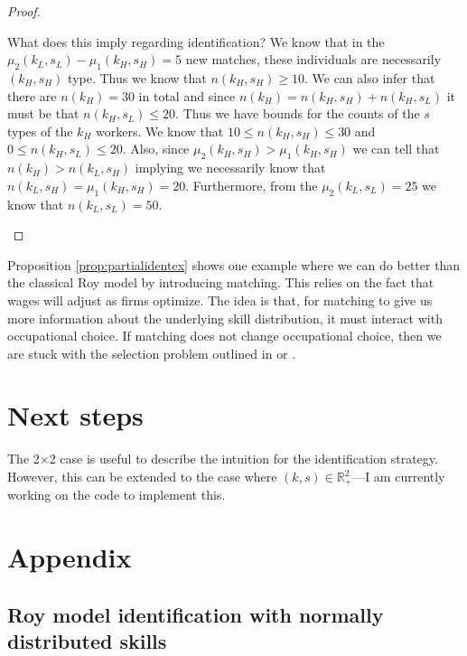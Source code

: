 \documentclass[12 pt]{article}
\begin{document}
\begin{proof}
\begin{enumerate}
		 What does this imply regarding identification? We know that in the $\mu_2(k_L,s_L)-\mu_1(k_H,s_H)=5$ new matches, these individuals are necessarily $(k_H,s_H)$ type. Thus we know that $n(k_H,s_H) \geq 10$. We can also infer that there are $n(k_H)=30$ in total and since $n(k_H) = n(k_H,s_H) + n(k_H,s_L)$ it must be that $n(k_H,s_L)\leq 20$. Thus we have bounds for the counts of the $s$ types of the $k_H$ workers. We know that $10 \leq n(k_H,s_H) \leq 30$ and $0 \leq n(k_H,s_L)\leq 20$. Also, since $\mu_2(k_H,s_H)>\mu_1(k_H,s_H)$ we can tell that $n(k_H) > n(k_L,s_H)$ implying we necessarily know that $n(k_L,s_H) = \mu_1(k_H,s_H) = 20$.  Furthermore, from the $\mu_2(k_L,s_L)=25$ we know that $n(k_L,s_L)=50$.  
	\end{enumerate}
\end{proof}

Proposition \ref{prop:partialidentex} shows one example where we can do better than the classical Roy model by introducing matching. This relies on the fact that wages will adjust as firms optimize. The idea is that, for matching to give us more information about the underlying skill distribution, it must interact with occupational choice. If matching does not change occupational choice, then we are stuck with the selection problem outlined in \citet{heckman1990empirical} or \citet{french2011identification}.

\section{Next steps}

The 2$\times$2 case is useful to describe the intuition for the identification strategy. However, this can be extended to the case where $(k,s)\in\mathbb{R}_+^2$---I am currently working on the code to implement this. 

\newpage



\newpage
\setcounter{section}{0}
\renewcommand{\thesection}{\Alph{section}}
\renewcommand\theequation{\thesection\arabic{equation}}
\section{Appendix}
\subsection{Roy model identification with normally distributed skills}
\end{document}
